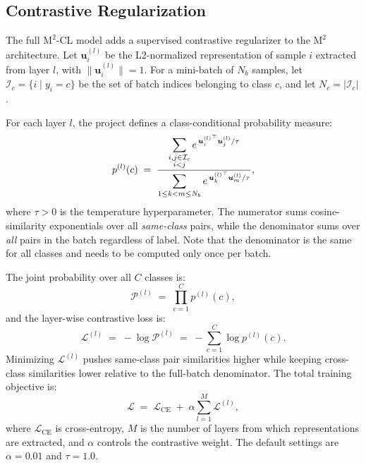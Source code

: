 \documentclass[11pt,a4paper]{article}
\newcommand{\method}{\texorpdfstring{$\mathrm{M}^2$\textup{-CL}}{M2-CL}}
\newcommand{\base}{\texorpdfstring{$\mathrm{M}^2$}{M2}}
\newcommand{\Lcal}{\mathcal{L}}
\newcommand{\Pcal}{\mathcal{P}}
\begin{document}
\subsection{Contrastive Regularization}
\label{sec:contrastive_loss}

The full \method{} model adds a supervised contrastive regularizer to the \base{}
architecture.  Let $\bm{u}_i^{(l)}$ be the L2-normalized representation of sample
$i$ extracted from layer $l$, with $\|\bm{u}_i^{(l)}\|=1$.  For a mini-batch of
$N_b$ samples, let $\mathcal{I}_c=\{i \mid y_i=c\}$ be the set of batch indices
belonging to class $c$, and let $N_c=|\mathcal{I}_c|$.

For each layer $l$, the project defines a class-conditional probability measure:
\begin{equation}
  p^{(l)}(c)
  \;=\;
  \frac{%
    \displaystyle
    \sum_{\substack{i,j \in \mathcal{I}_c \\ i<j}}
    e^{\,{\bm{u}_i^{(l)}}^\top \bm{u}_j^{(l)}/\tau}
  }{%
    \displaystyle
    \sum_{1 \le k < m \le N_b}
    e^{\,{\bm{u}_k^{(l)}}^\top \bm{u}_m^{(l)}/\tau}
  },
  \label{eq:p_layer}
\end{equation}
where $\tau>0$ is the temperature hyperparameter.  The numerator sums
cosine-similarity exponentials over all \emph{same-class} pairs, while the
denominator sums over \emph{all} pairs in the batch regardless of label.  Note
that the denominator is the same for all classes and needs to be computed only once
per batch.

The joint probability over all $C$ classes is:
\begin{equation}
  \Pcal^{(l)} \;=\; \prod_{c=1}^{C} p^{(l)}(c),
  \label{eq:P_joint}
\end{equation}
and the layer-wise contrastive loss is:
\begin{equation}
  \Lcal^{(l)}
  \;=\;
  -\log \Pcal^{(l)}
  \;=\;
  -\sum_{c=1}^{C} \log p^{(l)}(c).
  \label{eq:L_layer}
\end{equation}
Minimizing $\Lcal^{(l)}$ pushes same-class pair similarities higher while keeping
cross-class similarities lower relative to the full-batch denominator.  The total
training objective is:
\begin{equation}
  \Lcal
  \;=\;
  \Lcal_{\mathrm{CE}}
  \;+\;
  \alpha \sum_{l=1}^{M} \Lcal^{(l)},
  \label{eq:total_loss}
\end{equation}
where $\Lcal_{\mathrm{CE}}$ is cross-entropy, $M$ is the number of layers from
which representations are extracted, and $\alpha$ controls the contrastive weight.
The default settings are $\alpha=0.01$ and $\tau=1.0$.
\end{document}
